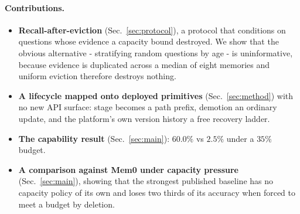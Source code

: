 \documentclass{article}
\theoremstyle{definition}\newtheorem{remark}{Remark}
\theoremstyle{plain}\newtheorem{proposition}{Proposition}
\begin{document}
\paragraph{Contributions.}
\begin{itemize}\itemsep3pt
  \item \textbf{Recall-after-eviction} (Sec.~\ref{sec:protocol}), a protocol
  that conditions on questions whose evidence a capacity bound destroyed. We
  show that the obvious alternative - stratifying random questions by age -
  is uninformative, because evidence is duplicated across a median of eight
  memories and uniform eviction therefore destroys nothing.
  \item \textbf{A lifecycle mapped onto deployed primitives}
  (Sec.~\ref{sec:method}) with no new API surface: stage becomes a path prefix,
  demotion an ordinary update, and the platform's own version history a free
  recovery ladder.
  \item \textbf{The capability result} (Sec.~\ref{sec:main}): $60.0\%$ vs
  $2.5\%$ under a $35\%$ budget.
  \item \textbf{A comparison against Mem0 under capacity pressure}
  (Sec.~\ref{sec:main}), showing that the strongest published baseline has no
  capacity policy of its own and loses two thirds of its accuracy when forced
  to meet a budget by deletion.
\end{itemize}
\end{document}
